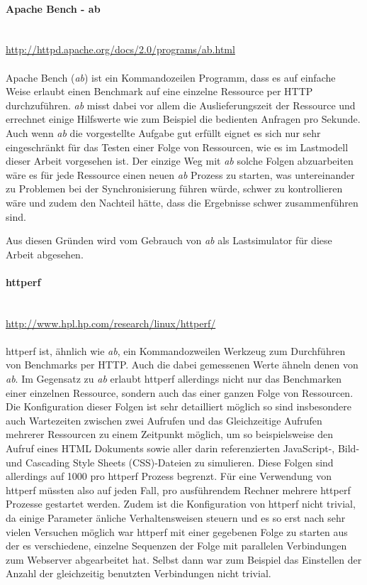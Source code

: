 \documentclass[10pt]{scrartcl}
\begin{document}
  \paragraph{Apache Bench - ab}  ~\\
  \url{http://httpd.apache.org/docs/2.0/programs/ab.html} 
  \\
  ~\\
  Apache Bench (\textit{ab}) ist ein Kommandozeilen Programm, dass es auf einfache Weise
  erlaubt einen Benchmark auf eine einzelne Ressource per HTTP durchzuführen.
  \textit{ab} misst dabei vor allem die Auslieferungszeit der Ressource und errechnet
  einige Hilfswerte wie zum Beispiel die bedienten Anfragen pro Sekunde.
  Auch wenn \textit{ab} die vorgestellte Aufgabe gut erfüllt eignet es sich nur sehr
  eingeschränkt für das Testen einer Folge von Ressourcen, wie es im Lastmodell
  dieser Arbeit vorgesehen ist. Der einzige Weg mit \textit{ab} solche Folgen 
  abzuarbeiten wäre es für jede Ressource einen neuen \textit{ab} Prozess zu starten, was
  untereinander zu Problemen bei der Synchronisierung führen würde, 
  schwer zu kontrollieren wäre und zudem den Nachteil hätte, dass die Ergebnisse
  schwer zusammenführen sind.
  
  Aus diesen Gründen wird vom Gebrauch von \textit{ab} als Lastsimulator für diese Arbeit
  abgesehen.
  
  \paragraph{httperf}  ~\\
  \url{http://www.hpl.hp.com/research/linux/httperf/}
  \\
  ~\\
  httperf ist, ähnlich wie \textit{ab}, ein Kommandozweilen Werkzeug zum
  Durchführen von Benchmarks per HTTP. Auch die dabei gemessenen Werte ähneln
  denen von \textit{ab}. Im Gegensatz zu \textit{ab} erlaubt httperf allerdings
  nicht nur das Benchmarken einer einzelnen Ressource, sondern auch das einer
  ganzen Folge von Ressourcen. Die Konfiguration dieser Folgen ist sehr 
  detailliert möglich so sind insbesondere auch Wartezeiten zwischen zwei 
  Aufrufen und das Gleichzeitige Aufrufen mehrerer Ressourcen zu einem Zeitpunkt
  möglich, um so beispielsweise den Aufruf eines HTML Dokuments sowie aller
  darin referenzierten JavaScript-, Bild- und Cascading Style Sheets (CSS)-Dateien zu simulieren. Diese Folgen sind allerdings auf 1000 pro httperf Prozess begrenzt. Für eine Verwendung von httperf müssten also auf jeden Fall, pro ausführendem Rechner mehrere httperf Prozesse gestartet werden. Zudem ist die Konfiguration von httperf nicht trivial, da einige Parameter änliche Verhaltensweisen steuern und es so erst nach sehr vielen Versuchen möglich war httperf mit einer gegebenen Folge zu starten aus der es verschiedene, einzelne Sequenzen der Folge mit parallelen Verbindungen zum Webserver abgearbeitet hat. Selbst dann war zum Beispiel das Einstellen der Anzahl der gleichzeitig benutzten Verbindungen nicht trivial.
  
\end{document}
